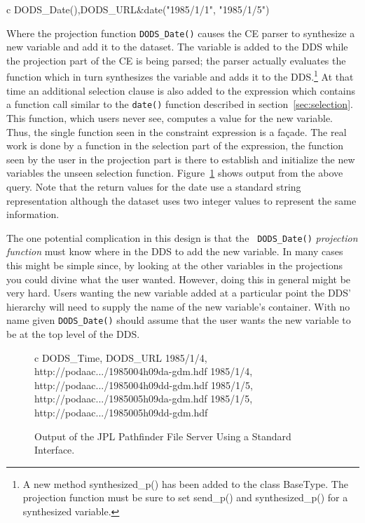 \documentclass[12pt]{article}
\begin{document}
\begin{code}{c}
  DODS_Date(),DODS_URL&date("1985/1/1", "1985/1/5")
\end{code}

Where the projection function {\tt DODS\_Date()} causes the CE parser to
synthesize a new variable and add it to the dataset. The variable is added to
the DDS while the projection part of the CE is being parsed; the parser
actually evaluates the function which in turn synthesizes the variable and
adds it to the DDS.\footnote{A new method synthesized\_p() has been added to
  the class BaseType. The projection function must be sure to set send\_p()
  and synthesized\_p() for a synthesized variable.} At that time an additional
selection clause is also added to the expression which contains a function
call similar to the {\tt date()} function described in
section~\ref{sec:selection}. This function, which users never see, computes a
value for the new variable. Thus, the single function seen in the constraint
expression is a fa\c{c}ade. The real work is done by a function in the
selection part of the expression, the function seen by the user in the
projection part is there to establish and initialize the new variables the
unseen selection function. Figure~\ref{pathstandard} shows output from the
above query.  Note that the return values for the date use a standard string
representation although the dataset uses two integer values to represent the
same information.

The one potential complication in this design is that the {\tt
  DODS\_Date()} \emph{projection function} must know where in the DDS
to add the new variable.  In many cases this might be simple since, by
looking at the other variables in the projections you could divine what the
user wanted. However, doing this in general might be very hard.
Users wanting the new variable added at a particular point the DDS' hierarchy
will need to supply the name of the new variable's container. With no name
given {\tt DODS\_Date()} should assume that the user wants the new
variable to be at the top level of the DDS.

\begin{figure}
\begin{code}{c}
  DODS_Time, DODS_URL
  1985/1/4, http://podaac.../1985004h09da-gdm.hdf
  1985/1/4, http://podaac.../1985004h09dd-gdm.hdf
  1985/1/5, http://podaac.../1985005h09da-gdm.hdf
  1985/1/5, http://podaac.../1985005h09dd-gdm.hdf
\end{code}
\caption{Output of the JPL Pathfinder File Server Using a Standard
  Interface.}
\label{pathstandard}
\end{figure}
\end{document}
